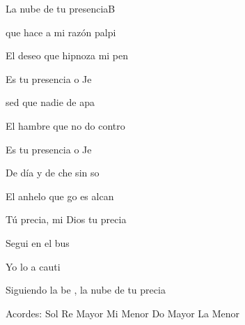 \documentclass[12pt, spanish]{book}
\begin{document}
\begin{song}{La nube de tu presencia}{B}
        \begin{SBExtraKeys}{
            \clearpage


            \begin{SBOpGroup}
                 que hace a mi razón palpi

                El deseo que hipnoza mi pen

                Es tu presencia o Je
            \end{SBOpGroup}

            \begin{SBOpGroup}
                 sed que nadie de apa

                El hambre que no do contro

                Es tu presencia o Je
            \end{SBOpGroup}

            \begin{SBChorus}
                De día y de che sin so

                El anhelo que go es alcan

                Tú precia, mi Dios tu precia
            \end{SBChorus}

            \begin{SBOpGroup}
                Segui en el bus

                Yo lo  a cauti

                Siguiendo la be , la nube de tu precia
            \end{SBOpGroup}

            \ifChordBk
            \begin{SBOpGroup}
                Acordes:\break
                \upchord{\G}\qquad Sol \hfill
                \upchord{\D}Re Mayor \hfill\null\break
                \upchord{\Em}\qquad Mi Menor \hfill
                \upchord{\C}\qquad Do Mayor \hfill\null\break
                \upchord{\Am}\qquad La Menor \hfill\null\break
            \end{SBOpGroup}
            \fi
        }\end{SBExtraKeys}
    \end{song}
\end{document}
